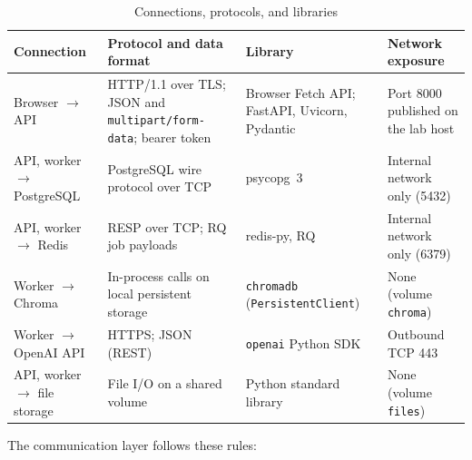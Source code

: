 \documentclass[12pt,a4paper]{article}
\begin{document}
\begin{table}[htbp]
\centering
\small
\renewcommand{\arraystretch}{1.3}
\begin{tabularx}{\textwidth}{|p{28mm}|p{46mm}|p{36mm}|X|}
\hline
\textbf{Connection} &
\textbf{Protocol and data format} &
\textbf{Library} &
\textbf{Network exposure} \\
\hline
Browser $\rightarrow$ API &
HTTP/1.1 over TLS; JSON and \texttt{multipart/form-data};
bearer token &
Browser Fetch API; FastAPI, Uvicorn, Pydantic &
Port 8000 published on the lab host \\
\hline
API, worker $\rightarrow$ PostgreSQL &
PostgreSQL wire protocol over TCP &
psycopg~3 &
Internal network only (5432) \\
\hline
API, worker $\rightarrow$ Redis &
RESP over TCP; RQ job payloads &
redis-py, RQ &
Internal network only (6379) \\
\hline
Worker $\rightarrow$ Chroma &
In-process calls on local persistent storage &
\texttt{chromadb} (\texttt{PersistentClient}) &
None (volume \texttt{chroma}) \\
\hline
Worker $\rightarrow$ OpenAI API &
HTTPS; JSON (REST) &
\texttt{openai} Python SDK &
Outbound TCP 443 \\
\hline
API, worker $\rightarrow$ file storage &
File I/O on a shared volume &
Python standard library &
None (volume \texttt{files}) \\
\hline
\end{tabularx}
\caption{Connections, protocols, and libraries}
\label{tab:communication}
\end{table}

The communication layer follows these rules:
\end{document}
